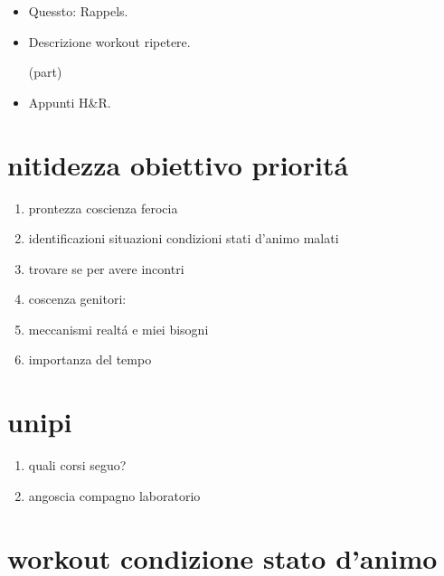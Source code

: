 \begin{itemize}

\item Quessto: Rappels.

\item Descrizione workout ripetere.


 (part)

\item Appunti H\&R.

\end{itemize}


\section{nitidezza obiettivo priorit\'a}

\begin{enumerate}

\item prontezza coscienza ferocia

\item identificazioni situazioni condizioni stati d'animo malati

\item trovare se per avere incontri

\item coscenza genitori:

\item meccanismi realt\'a e miei bisogni

\item importanza del tempo

\end{enumerate}

\section{unipi}

\begin{enumerate}

\item quali corsi seguo?

\item angoscia compagno laboratorio

\end{enumerate}


\section{workout condizione stato d'animo}

